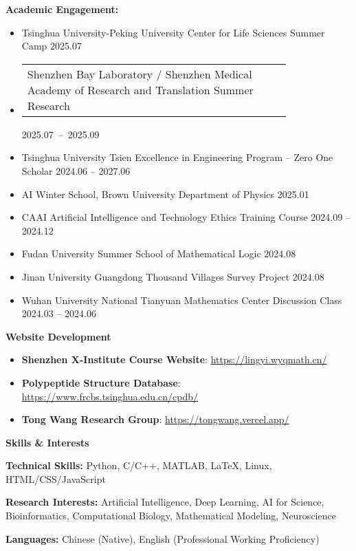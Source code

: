 \documentclass[11pt]{article}
\begin{document}
	\textbf{Academic Engagement:}
	\begin{itemize}[noitemsep, topsep=0pt, partopsep=0pt, parsep=0pt, leftmargin=*]
		\item Tsinghua University-Peking University Center for Life Sciences Summer Camp \hfill 2025.07
		\item \begin{tabular}[c]{@{}p{0.8\linewidth}@{}}Shenzhen Bay Laboratory / Shenzhen Medical Academy of Research and Translation Summer Research\end{tabular} \hfill \mbox{2025.07 -- 2025.09}
		\item Tsinghua University Tsien Excellence in Engineering Program -- Zero One Scholar \hfill 2024.06 -- 2027.06
		\item AI Winter School, Brown University Department of Physics \hfill 2025.01
		\item CAAI Artificial Intelligence and Technology Ethics Training Course \hfill 2024.09 -- 2024.12
		\item Fudan University Summer School of Mathematical Logic \hfill 2024.08
		\item Jinan University Guangdong Thousand Villages Survey Project \hfill 2024.08
		\item Wuhan University National Tianyuan Mathematics Center Discussion Class \hfill 2024.03 -- 2024.06
	\end{itemize}
	
	\vspace{12pt}

	\begin{center}
		\textbf{\large Website Development}
	\end{center}
	\begin{itemize}[noitemsep, topsep=0pt, partopsep=0pt, parsep=0pt, leftmargin=*]
		\item \textbf{Shenzhen X-Institute Course Website}: \href{https://lingyi.wyqmath.cn/}{https://lingyi.wyqmath.cn/}
		\item \textbf{Polypeptide Structure Database}: \href{https://www.frcbs.tsinghua.edu.cn/cpdb/}{https://www.frcbs.tsinghua.edu.cn/cpdb/}
		\item \textbf{Tong Wang Research Group}: \href{https://tongwang.vercel.app/}{https://tongwang.vercel.app/}
	\end{itemize}

	\vspace{12pt}

	\begin{center}
		\textbf{\large Skills \& Interests}
	\end{center}
	\textbf{Technical Skills:} Python, C/C++, MATLAB, LaTeX, Linux, HTML/CSS/JavaScript
	
	\textbf{Research Interests:} Artificial Intelligence, Deep Learning, AI for Science, Bioinformatics, Computational Biology, Mathematical Modeling, Neuroscience
	
	\textbf{Languages:} Chinese (Native), English (Professional Working Proficiency)
	
\end{document}
